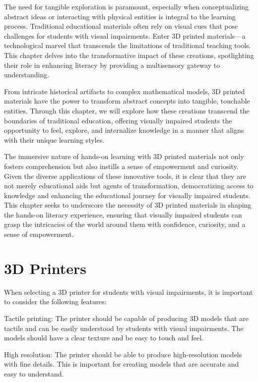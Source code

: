 \documentclass[12pt,letterpaper,twoside,openright]{report}
\begin{document}
The need for tangible exploration is paramount, especially when conceptualizing abstract ideas or interacting with physical entities is integral to the learning process. Traditional educational materials often rely on visual cues that pose challenges for students with visual impairments. Enter 3D printed materials—a technological marvel that transcends the limitations of traditional teaching tools. This chapter delves into the transformative impact of these creations, spotlighting their role in enhancing literacy by providing a multisensory gateway to understanding.

From intricate historical artifacts to complex mathematical models, 3D printed materials have the power to transform abstract concepts into tangible, touchable entities. Through this chapter, we will explore how these creations transcend the boundaries of traditional education, offering visually impaired students the opportunity to feel, explore, and internalize knowledge in a manner that aligns with their unique learning styles.

The immersive nature of hands-on learning with 3D printed materials not only fosters comprehension but also instills a sense of empowerment and curiosity. Given the diverse applications of these innovative tools, it is clear that they are not merely educational aids but agents of transformation, democratizing access to knowledge and enhancing the educational journey for visually impaired students. This chapter seeks to underscore the necessity of 3D printed materials in shaping the hands-on literacy experience, ensuring that visually impaired students can grasp the intricacies of the world around them with confidence, curiosity, and a sense of empowerment. 

\pagebreak \hypertarget{d-print-equipment}{}\section{3D Printers}\label{d-print-equipment}
When selecting a 3D printer for students with visual impairments, it is important to consider the following features:

Tactile printing: The printer should be capable of producing 3D models that are tactile and can be easily understood by students with visual impairments. The models should have a clear texture and be easy to touch and feel.

High resolution: The printer should be able to produce high-resolution models with fine details. This is important for creating models that are accurate and easy to understand.
\end{document}
